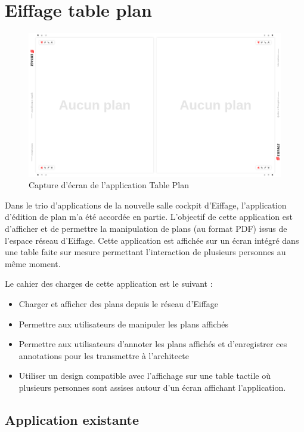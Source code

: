 \section{Eiffage table plan}
\label{eiffageTablePlan}

\begin{figure}[h]
    \centering
    \includegraphics[scale=0.5]{img/table-plan-capture.png}
    \caption{Capture d'écran de l'application Table Plan}
\end{figure}

Dans le trio d'applications de la nouvelle salle cockpit d'Eiffage, l'application d'édition de plan m'a été accordée en partie.
L'objectif de cette application est d'afficher et de permettre la manipulation de plans (au format PDF) issus de  l'espace réseau d'Eiffage.
Cette application est affichée sur un écran intégré dans une table faite sur mesure permettant l'interaction de plusieurs personnes au même moment.

Le cahier des charges de cette application est le suivant :
\begin{itemize}
    \item Charger et afficher des plans depuis le réseau d'Eiffage
    \item Permettre aux utilisateurs de manipuler les plans affichés
    \item Permettre aux utilisateurs d'annoter les plans affichés et d'enregistrer ces annotations pour les transmettre à l'architecte
    \item Utiliser un design compatible avec l'affichage sur une table tactile où plusieurs personnes sont assises autour d'un écran affichant l'application.
\end{itemize}

\subsection{Application existante}
\label{eiffageTablePlanApplicationExistante}

